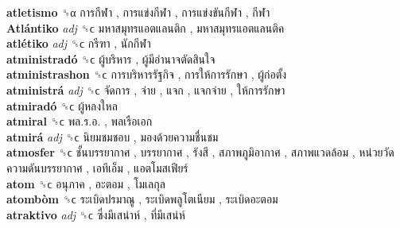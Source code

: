 \textbf{atletismo} ␝α   การกีฬา ,  การแข่งกีฬา ,  การแข่งขันกีฬา ,  กีฬา   \\
\textbf{Atlántiko} \emph{adj}  ␝ϲ   มหาสมุทรแอตแลนติก ,  มหาสมุทรแอตแลนติค   \\
\textbf{atlétiko} \emph{adj}  ␝ϲ   กรีฑา ,  นักกีฬา   \\
\textbf{atministradó} ␝ϲ   ผู้บริหาร ,  ผู้มีอำนาจตัดสินใจ   \\
\textbf{atministrashon} ␝ϲ   การบริหารรัฐกิจ ,  การให้การรักษา ,  ผู้ก่อตั้ง   \\
\textbf{atministrá} \emph{adj}  ␝ϲ   จัดการ ,  จ่าย ,  แจก ,  แจกจ่าย ,  ให้การรักษา   \\
\textbf{atmiradó} ␝ϲ   ผู้หลงใหล   \\
\textbf{atmiral} ␝ϲ   พล.ร.อ. ,  พลเรือเอก   \\
\textbf{atmirá} \emph{adj}  ␝ϲ   นิยมชมชอบ ,  มองด้วยความชื่นชม   \\
\textbf{atmosfer} ␝ϲ   ชั้นบรรยากาศ ,  บรรยากาศ ,  รังสี ,  สภาพภูมิอากาศ ,  สภาพแวดล้อม ,  หน่วยวัดความดันบรรยากาศ ,  เอทีเอ็ม ,  แอตโมสเฟียร์   \\
\textbf{atom} ␝ϲ   อนุภาค ,  อะตอม ,  โมเลกุล   \\
\textbf{atombòm} ␝ϲ   ระเบิดปรมาณู ,  ระเบิดพลูโตเนียม ,  ระเบิดอะตอม   \\
\textbf{atraktivo} \emph{adj}  ␝ϲ   ซึ่งมีเสน่าห์ ,  ที่มีเสน่ห์   \\
